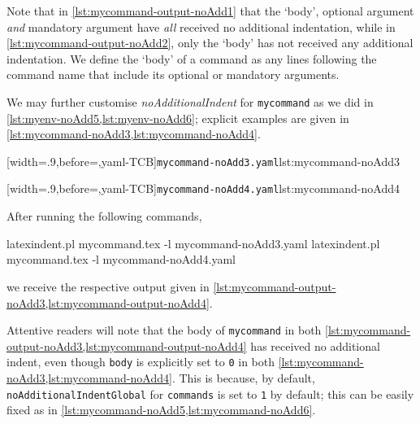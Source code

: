 Note that in \cref{lst:mycommand-output-noAdd1} that the `body', optional argument \emph{and} mandatory argument have \emph{all} received 
no additional indentation, while in \cref{lst:mycommand-output-noAdd2}, only the `body' has not received any additional indentation. We define 
the `body' of a command as any lines following the command name that include its optional or mandatory arguments.

We may further customise \emph{noAdditionalIndent} for \texttt{mycommand} as we did in \vref{lst:myenv-noAdd5,lst:myenv-noAdd6}; explicit examples
are given in \cref{lst:mycommand-noAdd3,lst:mycommand-noAdd4}.

\begin{minipage}{.45\textwidth}
[width=.9\linewidth,before=\centering,yaml-TCB]{\texttt{mycommand-noAdd3.yaml}}{lst:mycommand-noAdd3}
\end{minipage}
\hfill
\begin{minipage}{.45\textwidth}
[width=.9\linewidth,before=\centering,yaml-TCB]{\texttt{mycommand-noAdd4.yaml}}{lst:mycommand-noAdd4}
\end{minipage}

After running the following commands,
\begin{commandshell}
latexindent.pl mycommand.tex -l mycommand-noAdd3.yaml  
latexindent.pl mycommand.tex -l mycommand-noAdd4.yaml  
\end{commandshell}
we receive the respective output given in \cref{lst:mycommand-output-noAdd3,lst:mycommand-output-noAdd4}.

\begin{minipage}{.45\textwidth}
\end{minipage}
\hfill
\begin{minipage}{.45\textwidth}
\end{minipage}

Attentive readers will note that the body of \texttt{mycommand} in both \cref{lst:mycommand-output-noAdd3,lst:mycommand-output-noAdd4} 
has received no additional indent, even though \texttt{body} is explicitly set to \texttt{0} in both \cref{lst:mycommand-noAdd3,lst:mycommand-noAdd4}.
This is because, by default, \texttt{noAdditionalIndentGlobal} for \texttt{commands} is set to \texttt{1} by default; this can be easily 
fixed as in \cref{lst:mycommand-noAdd5,lst:mycommand-noAdd6}.

